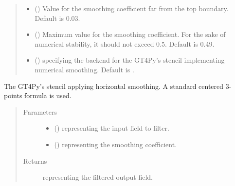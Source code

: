 \documentclass[letterpaper,10pt,english]{sphinxmanual}
\begin{document}
\begin{fulllineitems}
\begin{fulllineitems}
\begin{quote}
\begin{description}
\begin{itemize}
\item {} 
 () \textendash{} Value for the smoothing coefficient far from the top boundary. Default is 0.03.

\item {} 
 () \textendash{} Maximum value for the smoothing coefficient. For the sake of numerical stability, it should not
exceed 0.5. Default is 0.49.

\item {} 
 () \textendash{}  specifying the backend for the GT4Py’s stencil implementing numerical
smoothing. Default is .

\end{itemize}

\end{description}\end{quote}

\end{fulllineitems}


\begin{fulllineitems}
\label{\detokenize{api:dycore.horizontal_smoothing.HorizontalSmoothingFirstOrderYZ._stencil_defs}}
The GT4Py’s stencil applying horizontal smoothing. A standard centered 3-points formula is used.
\begin{quote}\begin{description}
\item[{Parameters}] \leavevmode\begin{itemize}
\item {} 
 () \textendash{}  representing the input field to filter.

\item {} 
 () \textendash{}  representing the smoothing coefficient.

\end{itemize}

\item[{Returns}] \leavevmode
{} representing the filtered output field.


\end{description}
\end{quote}
\end{fulllineitems}
\end{fulllineitems}
\end{document}
